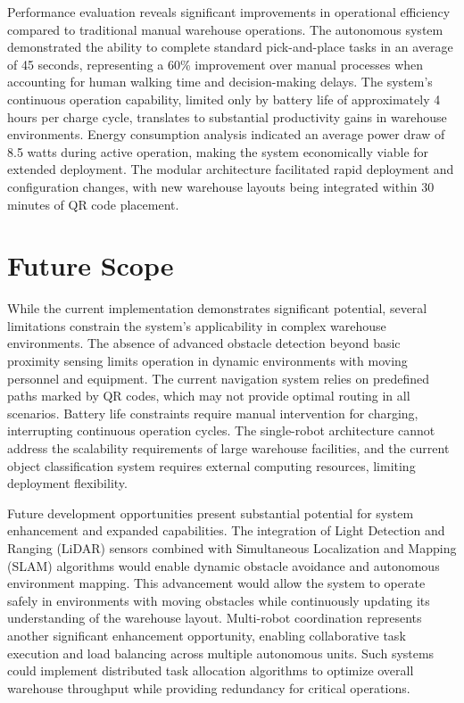 Performance evaluation reveals significant improvements in operational efficiency compared to traditional manual warehouse operations. The autonomous system demonstrated the ability to complete standard pick-and-place tasks in an average of 45 seconds, representing a 60\% improvement over manual processes when accounting for human walking time and decision-making delays. The system's continuous operation capability, limited only by battery life of approximately 4 hours per charge cycle, translates to substantial productivity gains in warehouse environments. Energy consumption analysis indicated an average power draw of 8.5 watts during active operation, making the system economically viable for extended deployment. The modular architecture facilitated rapid deployment and configuration changes, with new warehouse layouts being integrated within 30 minutes of QR code placement.

\section{Future Scope}

While the current implementation demonstrates significant potential, several limitations constrain the system's applicability in complex warehouse environments. The absence of advanced obstacle detection beyond basic proximity sensing limits operation in dynamic environments with moving personnel and equipment. The current navigation system relies on predefined paths marked by QR codes, which may not provide optimal routing in all scenarios. Battery life constraints require manual intervention for charging, interrupting continuous operation cycles. The single-robot architecture cannot address the scalability requirements of large warehouse facilities, and the current object classification system requires external computing resources, limiting deployment flexibility.

Future development opportunities present substantial potential for system enhancement and expanded capabilities. The integration of Light Detection and Ranging (LiDAR) sensors combined with Simultaneous Localization and Mapping (SLAM) algorithms would enable dynamic obstacle avoidance and autonomous environment mapping. This advancement would allow the system to operate safely in environments with moving obstacles while continuously updating its understanding of the warehouse layout. Multi-robot coordination represents another significant enhancement opportunity, enabling collaborative task execution and load balancing across multiple autonomous units. Such systems could implement distributed task allocation algorithms to optimize overall warehouse throughput while providing redundancy for critical operations.

